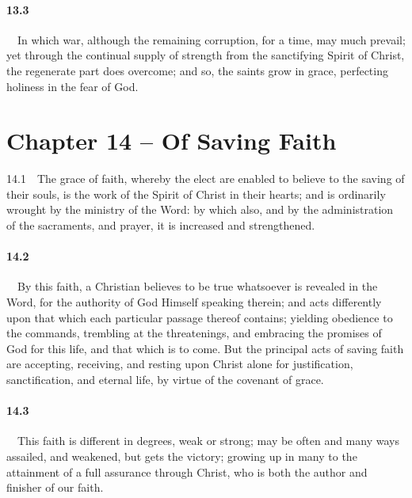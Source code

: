 \paragraph{13.3}\ \ In which war, although the remaining corruption, for a time, may much prevail; yet through the continual supply of strength from the sanctifying Spirit of Christ, the regenerate part does overcome; and so, the saints grow in grace, perfecting holiness in the fear of God.  

\section{Chapter 14 -- Of Saving Faith} 14.1\ \ The grace of faith, whereby the elect are enabled to believe to the saving of their souls, is the work of the Spirit of Christ in their hearts; and is ordinarily wrought by the ministry of the Word: by which also, and by the administration of the sacraments, and prayer, it is increased and strengthened.   
\bigskip
\paragraph{14.2}\ \ By this faith, a Christian believes to be true whatsoever is revealed in the Word, for the authority of God Himself speaking therein; and acts differently upon that which each particular passage thereof contains; yielding obedience to the commands, trembling at the threatenings, and embracing the promises of God for this life, and that which is to come. But the principal acts of saving faith are accepting, receiving, and resting upon Christ alone for justification, sanctification, and eternal life, by virtue of the covenant of grace.   
\bigskip
\paragraph{14.3}\ \ This faith is different in degrees, weak or strong; may be often and many ways assailed, and weakened, but gets the victory; growing up in many to the attainment of a full assurance through Christ, who is both the author and finisher of our faith.  

